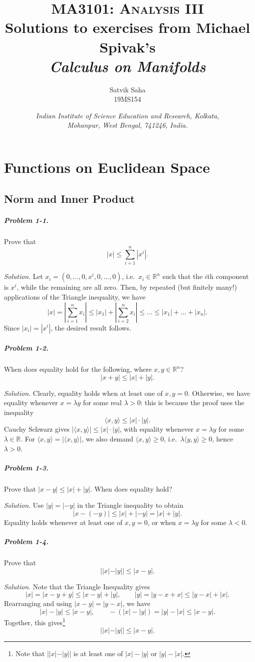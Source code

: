 \documentclass[11pt]{report}
\title{
    \Large\textsc{MA3101: Analysis III} \\
    \vspace{10pt}
    \huge Solutions to exercises from Michael Spivak's \\
    \textit{Calculus on Manifolds}
}
\author{
    \large Satvik Saha%
    \\\textsc{\small 19MS154}
}
\date{\normalsize
    \textit{Indian Institute of Science Education and Research, Kolkata, \\
    Mohanpur, West Bengal, 741246, India.} \\
}
\newcommand{\R}{\mathbb{R}}
\newcommand{\ip}[2]{\langle #1, #2 \rangle}
\newcommand{\problem}[1]{\paragraph{Problem #1.}}
\newcommand{\solution}{\noindent\textit{Solution.} }
\begin{document}
    \maketitle
    \tableofcontents
    

    \chapter{Functions on Euclidean Space}
    \section{Norm and Inner Product}

    \problem{1-1} Prove that \[
        |x| \leq \sum_{i = 1}^n |x^i|.
    \] 

    \solution Let $x_i = (0, \dots, 0, x^i, 0, \dots, 0)$, i.e.\ $x_i \in
    \R^n$ such that the $i$th component is $x^i$, while the remaining are all zero.
    Then, by repeated (but finitely many!) applications of the Triangle inequality, we
    have \[
        |x|= \left|\sum_{i = 1}^n x_i\right| \leq |x_1| + \left|\sum_{i = 2}^n
        x_i\right| \leq \dots \leq |x_1| + \dots + |x_n|.
    \] Since $|x_i| = |x^i|$, the desired result follows.


    \problem{1-2} When does equality hold for the following, where $x, y \in \R^n$? \[
        |x + y| \leq |x| + |y|.
    \] 

    \solution Clearly, equality holds when at least one of $x, y = 0$. Otherwise,
    we have equality whenever $x = \lambda y$ for some real $\lambda > 0$: this is
    because the proof uses the inequality \[
        \ip{x}{y} \leq |x| \cdot|y|.
    \] Cauchy Schwarz gives $|\ip{x}{y}| \leq |x|\cdot|y|$, with equality whenever $x
    = \lambda y$ for some $\lambda \in \R$. For $\ip{x}{y} = |\ip{x}{y}|$, we also
    demand $\ip{x}{y} \geq 0$, i.e.\ $\lambda \ip{y}{y} \geq 0$, hence $\lambda > 0$.

    
    \problem{1-3} Prove that $|x - y| \leq |x| + |y|$. When does equality hold?

    \solution Use $|y| = |-y|$ in the Triangle inequality to obtain \[
        |x - (-y)| \leq |x| + |-y| = |x| + |y|.
    \] Equality holds whenever at least one of $x, y = 0$, or when $x = \lambda y$
    for some $\lambda < 0$.


    \problem{1-4} Prove that \[
        | |x| - |y| | \leq |x - y|.
    \]

    \solution Note that the Triangle Inequality gives \[
        |x| = |x - y + y| \leq |x - y| + |y|, \qquad |y| = |y - x + x| \leq |y - x| +
        |x|.
    \] Rearranging and using $|x - y| = |y - x|$, we have \[
        |x| - |y| \leq |x - y|, \qquad -(|x| - |y|) = |y| - |x| \leq |x - y|.
    \] Together, this gives\footnote{Note that $| |x| - |y| |$ is at least one of
    $|x| - |y|$ or $|y| - |x|$.} \[
        | |x| - |y| | \leq |x - y|.
    \] 
\end{document}
